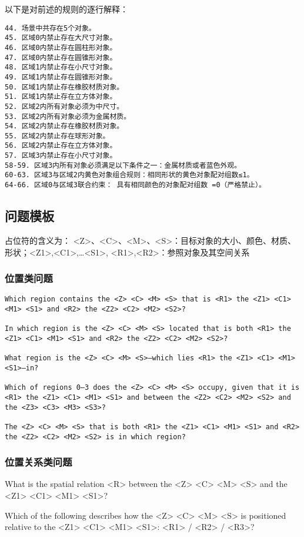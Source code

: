 以下是对前述的规则的逐行解释：
\begin{lstlisting}
44. 场景中共存在5个对象。
45. 区域0内禁止存在大尺寸对象。
46. 区域0内禁止存在圆柱形对象。
47. 区域0内禁止存在圆锥形对象。
48. 区域1内禁止存在小尺寸对象。
49. 区域1内禁止存在圆锥形对象。
50. 区域1内禁止存在橡胶材质对象。
51. 区域1内禁止存在立方体对象。
52. 区域2内所有对象必须为中尺寸。
53. 区域2内所有对象必须为金属材质。
54. 区域2内禁止存在橡胶材质对象。
55. 区域2内禁止存在球形对象。
56. 区域2内禁止存在立方体对象。
57. 区域3内禁止存在小尺寸对象。
58-59. 区域3内所有对象必须满足以下条件之一：金属材质或者蓝色外观。
60-63. 区域3与区域2内黄色对象组合规则：相同形状的黄色对象配对组数≤1。
64-66. 区域0与区域3联合约束： 具有相同颜色的对象配对组数 =0（严格禁止）。
\end{lstlisting}
\subsection{问题模板}
占位符的含义为：
<Z>、<C>、<M>、<S>：目标对象的大小、颜色、材质、形状；<Z1>,<C1>,…<S1>, <R1>,<R2>：参照对象及其空间关系
\subsubsection{位置类问题}
\begin{lstlisting}
Which region contains the <Z> <C> <M> <S> that is <R1> the <Z1> <C1> <M1> <S1> and <R2> the <Z2> <C2> <M2> <S2>?

In which region is the <Z> <C> <M> <S> located that is both <R1> the <Z1> <C1> <M1> <S1> and <R2> the <Z2> <C2> <M2> <S2>?

What region is the <Z> <C> <M> <S>—which lies <R1> the <Z1> <C1> <M1> <S1>—in?

Which of regions 0–3 does the <Z> <C> <M> <S> occupy, given that it is <R1> the <Z1> <C1> <M1> <S1> and between the <Z2> <C2> <M2> <S2> and the <Z3> <C3> <M3> <S3>?

The <Z> <C> <M> <S> that is both <R1> the <Z1> <C1> <M1> <S1> and <R2> the <Z2> <C2> <M2> <S2> is in which region?
\end{lstlisting}
\subsubsection{位置关系类问题}
What is the spatial relation <R> between the <Z> <C> <M> <S> and the <Z1> <C1> <M1> <S1>?

Which of the following describes how the <Z> <C> <M> <S> is positioned relative to the <Z1> <C1> <M1> <S1>: <R1> / <R2> / <R3>?

